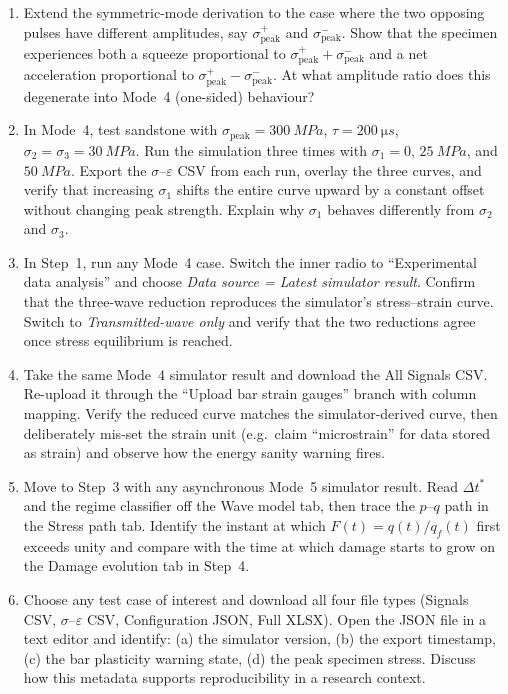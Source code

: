 \documentclass[11pt,a4paper,openany]{book}
\providecommand{\SI}[2]{\qty{#1}{#2}}
\theoremstyle{handbook}
\newcommand{\sig}{\sigma}
\newcommand{\eps}{\varepsilon}
\newcommand{\sigpeak}{\sig_{\text{peak}}}
\begin{document}
\begin{enumerate}[leftmargin=*,itemsep=4pt]
        from first principles (force and velocity continuity), without
        consulting Chapter~\ref{ch:mode6}.
  \item Extend the symmetric-mode derivation to the case where the two
        opposing pulses have different amplitudes, say $\sigpeak^{+}$ and
        $\sigpeak^{-}$. Show that the specimen experiences both a squeeze
        proportional to $\sigpeak^{+}+\sigpeak^{-}$ and a net acceleration
        proportional to $\sigpeak^{+}-\sigpeak^{-}$. At what amplitude
        ratio does this degenerate into Mode~4 (one-sided) behaviour?
  \item In Mode~4, test sandstone with $\sigpeak=\SI{300}{MPa}$,
        $\tau=\SI{200}{\micro s}$, $\sig_2=\sig_3=\SI{30}{MPa}$. Run the
        simulation three times with $\sig_1=0$, $\SI{25}{MPa}$, and
        $\SI{50}{MPa}$. Export the $\sig$--$\eps$ CSV from each run,
        overlay the three curves, and verify that increasing $\sig_1$
        shifts the entire curve upward by a constant offset without
        changing peak strength. Explain why $\sig_1$ behaves differently
        from $\sig_2$ and $\sig_3$.
  \item In Step~1, run any Mode~4 case. Switch the inner radio to
        ``Experimental data analysis'' and choose \emph{Data source =
        Latest simulator result}. Confirm that the three-wave reduction
        reproduces the simulator's stress--strain curve. Switch to
        \emph{Transmitted-wave only} and verify that the two reductions
        agree once stress equilibrium is reached.
  \item Take the same Mode~4 simulator result and download the All
        Signals CSV. Re-upload it through the ``Upload bar strain
        gauges'' branch with column mapping. Verify the reduced curve
        matches the simulator-derived curve, then deliberately mis-set
        the strain unit (e.g.\ claim ``microstrain'' for data stored as
        strain) and observe how the energy sanity warning fires.
  \item Move to Step~3 with any asynchronous Mode~5 simulator result.
        Read $\Delta t^{\ast}$ and the regime classifier off the Wave
        model tab, then trace the $p$--$q$ path in the Stress path tab.
        Identify the instant at which $F(t)=q(t)/q_f(t)$ first exceeds
        unity and compare with the time at which damage starts to grow
        on the Damage evolution tab in Step~4.
  \item Choose any test case of interest and download all four file
        types (Signals CSV, $\sig$--$\eps$ CSV, Configuration JSON, Full
        XLSX). Open the JSON file in a text editor and identify:
        (a) the simulator version, (b) the export timestamp, (c) the bar
        plasticity warning state, (d) the peak specimen stress. Discuss
        how this metadata supports reproducibility in a research
        context.
\end{enumerate}

\backmatter

\printbibliography[heading=bibintoc,title={References}]
\end{document}
